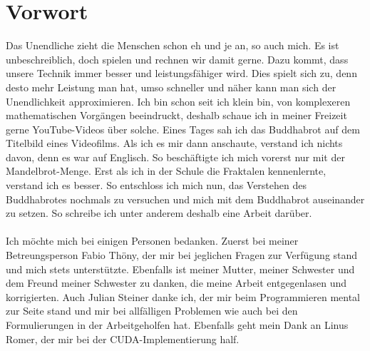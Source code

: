 \section*{Vorwort}
Das Unendliche zieht die Menschen schon eh und je an, so auch mich. Es ist unbeschreiblich, doch spielen und rechnen wir damit gerne. Dazu kommt, dass unsere Technik immer besser und leistungsfähiger wird. Dies spielt sich zu, denn desto mehr Leistung man hat, umso schneller und näher kann man sich der Unendlichkeit approximieren. Ich bin schon seit ich klein bin, von komplexeren mathematischen Vorgängen beeindruckt, deshalb schaue ich in meiner Freizeit gerne YouTube-Videos über solche. Eines Tages sah ich das Buddhabrot auf dem Titelbild eines Videofilms. Als ich es mir dann anschaute, verstand ich nichts davon, denn es war auf Englisch. So beschäftigte ich mich vorerst nur mit der Mandelbrot-Menge. Erst als ich in der Schule die Fraktalen kennenlernte, verstand ich es besser. So entschloss ich mich nun, das Verstehen des Buddhabrotes nochmals zu versuchen und mich mit dem Buddhabrot auseinander zu setzen. So schreibe ich unter anderem deshalb eine Arbeit darüber.\\
\\
Ich möchte mich bei einigen Personen bedanken. Zuerst bei meiner Betreungsperson Fabio Thöny, der mir bei jeglichen Fragen zur Verfügung stand und mich stets unterstützte. Ebenfalls ist meiner Mutter, meiner Schwester und dem Freund meiner Schwester zu danken, die meine Arbeit entgegenlasen und korrigierten. Auch Julian Steiner danke ich, der mir beim Programmieren mental zur Seite stand und mir bei allfälligen Problemen wie auch bei den Formulierungen in der Arbeitgeholfen hat. Ebenfalls geht mein Dank an Linus Romer, der mir bei der CUDA-Implementierung half.